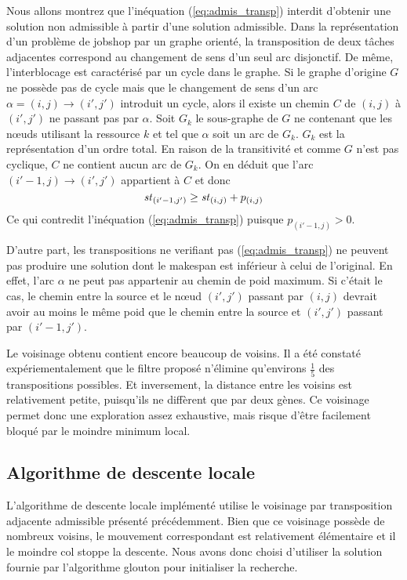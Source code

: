 \documentclass[french]{rapport}
\begin{document}
Nous allons montrez que l'inéquation (\ref{eq:admis_transp}) interdit d'obtenir une solution non
admissible à partir d'une solution admissible. Dans la représentation d'un problème de jobshop par
un graphe orienté, la transposition de deux tâches adjacentes correspond au changement de sens d'un
seul arc disjonctif. De même, l'interblocage est caractérisé par un cycle dans le graphe. Si le
graphe d'origine $G$ ne possède pas de cycle mais que le changement de sens d'un arc $\alpha = (i,j)
\rightarrow (i',j')$ introduit un cycle, alors il existe un chemin $C$ de $(i,j)$ à $(i',j')$ ne
passant pas par $\alpha$. Soit $G_k$ le sous-graphe de $G$ ne contenant que les nœuds utilisant la
ressource $k$ et tel que $\alpha$ soit un arc de $G_k$. $G_k$ est la représentation d'un ordre
total. En raison de la transitivité et comme $G$ n'est pas cyclique, $C$ ne contient aucun arc de
$G_k$. On en déduit que l'arc $(i'-1,j) \rightarrow (i',j')$ appartient à $C$ et donc 
$$ \mathit{st}_{(i'-1,j')} \geq \mathit{st}_{(i,j)} + p_{(i,j)} $$
Ce qui contredit l'inéquation (\ref{eq:admis_transp}) puisque $p_{(i'-1,j)} > 0$.

D'autre part, les transpositions ne verifiant pas (\ref{eq:admis_transp}) ne peuvent pas produire
une solution dont le makespan est inférieur à celui de l'original. En effet, l'arc $\alpha$ ne peut
pas appartenir au chemin de poid maximum. Si c'était le cas, le chemin entre la
source et le nœud $(i',j')$ passant par $(i,j)$ devrait avoir au moins le même poid que le chemin
entre la source et $(i',j')$ passant par $(i'-1,j')$.

Le voisinage obtenu contient encore beaucoup de voisins. Il a été constaté expériementalement que le
filtre proposé n'élimine qu'environs $\frac{1}{5}$ des transpositions possibles. Et inversement, la
distance entre les voisins est relativement petite, puisqu'ils ne diffèrent que par deux gènes. Ce
voisinage permet donc une exploration assez exhaustive, mais risque d'être facilement bloqué par le
moindre minimum local.


\subsection{Algorithme de descente locale}

L'algorithme de descente locale implémenté utilise le voisinage par transposition adjacente
admissible présenté précédemment. Bien que ce voisinage possède de nombreux voisins, le mouvement
correspondant est relativement élémentaire et il le moindre col stoppe la descente. Nous avons donc
choisi d'utiliser la solution fournie par l'algorithme glouton pour initialiser la recherche.
\end{document}
